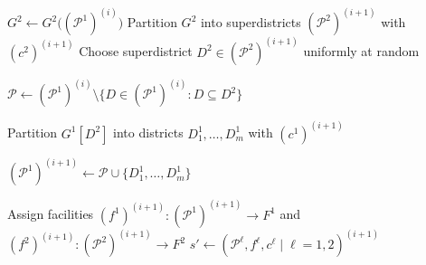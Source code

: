 \documentclass[11pt]{article}
\theoremstyle{definition}
\begin{document}
\begin{algorithm}[tbp]
\LinesNumbered
\caption{Outline of FalCom for $|L| = 2$}\label{alg:overview}


\BlankLine

$G^2 \leftarrow G^2\bigl((\mathcal{P}^1)^{(i)}\bigr)$ 
Partition $G^2$ into superdistricts $(\mathcal{P}^2)^{(i+1)}$ with $(c^2)^{(i+1)}$ 
Choose superdistrict $D^2 \in (\mathcal{P}^2)^{(i+1)}$
    uniformly at random\;

$\mathcal{P} \leftarrow (\mathcal{P}^1)^{(i)}
    \setminus \{D \in (\mathcal{P}^1)^{(i)} : D \subseteq D^2\}$

Partition $G^1[D^2]$ into districts
    $D_1^1, \ldots, D_m^1$ with $(c^1)^{(i+1)}$

$(\mathcal{P}^1)^{(i+1)} \leftarrow
    \mathcal{P} \cup \{D_1^1, \ldots, D_m^1\}$\;

Assign facilities $(f^1)^{(i+1)} \colon (\mathcal{P}^1)^{(i+1)} \to F^1$ and $(f^2)^{(i+1)} \colon (\mathcal{P}^2)^{(i+1)} \to F^2$ 
$s' \leftarrow
    (\mathcal{P}^\ell, f^\ell, c^\ell \mid \ell=1,2)^{(i+1)}$\;

\BlankLine
{}
\end{algorithm}

\medskip
\end{document}
